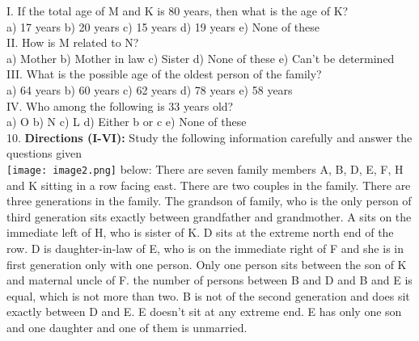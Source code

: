 \documentclass[
]{article}
\begin{document}
I. If the total age of M and K is 80 years, then what is the age of K?\\
a) 17 years \hspace{2mm}b) 20 years \hspace{2mm}c) 15 years \hspace{2mm}d) 19 years \hspace{2mm}e) None of these\\

II. How is M related to N?\\
a) Mother \hspace{2mm}b) Mother in law \hspace{2mm}c) Sister
\hspace{2mm}d) None of these \hspace{2mm}e) Can’t be determined\\

III. What is the possible age of the oldest person of the family?\\
a) 64 years \hspace{2mm}b) 60 years \hspace{2mm}c) 62 years \hspace{2mm}d) 78 years \hspace{2mm}e) 58 years\\

IV. Who among the following is 33 years old?\\
a) O \hspace{2mm}b) N \hspace{2mm}c) L
\hspace{2mm}d) Either b or c \hspace{2mm}e) None of these\\

10. \textbf{Directions (I-VI):} Study the following information carefully and answer the questions given\\
\texttt{[image: image2.png]}
below: There are seven family members A, B, D, E, F, H and K sitting in a row facing east.
There are two couples in the family. There are three generations in the family. The grandson
of family, who is the only person of third generation sits exactly between grandfather and
grandmother. A sits on the immediate left of H, who is sister of K. D sits at the extreme north
end of the row. D is daughter-in-law of E, who is on the immediate right of F and she is in
first generation only with one person. Only one person sits between the son of K and maternal
uncle of F. the number of persons between B and D and B and E is equal, which is not more
than two. B is not of the second generation and does sit exactly between D and E. E doesn’t
sit at any extreme end. E has only one son and one daughter and one of them is unmarried.\\
\end{document}
